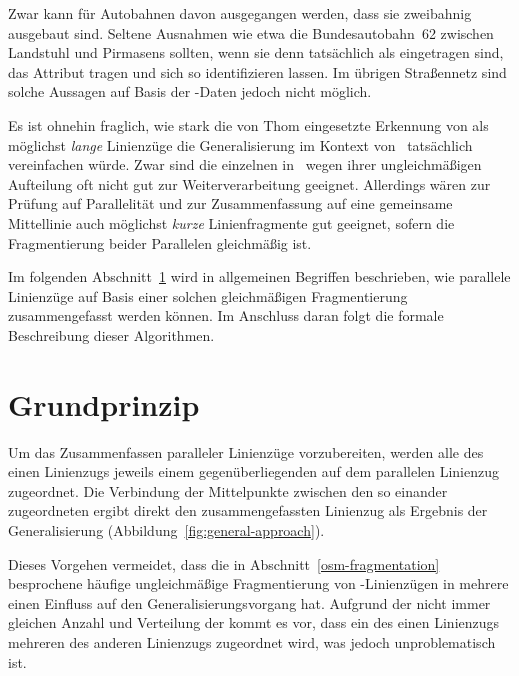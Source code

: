 \documentclass[../main/thesis.tex]{subfiles}
\begin{document}
Zwar kann für Autobahnen davon ausgegangen werden, dass sie zweibahnig ausgebaut sind.
Seltene Ausnahmen wie etwa die Bundesautobahn~62 zwischen Landstuhl und Pirmasens sollten, wenn sie denn tatsächlich als  eingetragen sind, das Attribut  tragen und sich so identifizieren lassen.
Im übrigen Straßennetz sind solche Aussagen auf Basis der \osm-Daten jedoch nicht möglich.

Es ist ohnehin fraglich, wie stark die von Thom eingesetzte Erkennung von  als möglichst \emph{lange} Linienzüge die Generalisierung im Kontext von \osm\ tatsächlich vereinfachen würde.
Zwar sind die einzelnen  in \osm\ wegen ihrer ungleichmäßigen Aufteilung oft nicht gut zur Weiterverarbeitung geeignet.
Allerdings wären zur Prüfung auf Parallelität und zur Zusammenfassung auf eine gemeinsame Mittellinie auch möglichst \emph{kurze} Linienfragmente gut geeignet, sofern die Fragmentierung beider Parallelen gleichmäßig ist.

Im folgenden Abschnitt~\ref{ch:algorithm-principle} wird in allgemeinen Begriffen beschrieben, wie parallele Linienzüge auf Basis einer solchen gleichmäßigen Fragmentierung zusammengefasst werden können.
Im Anschluss daran folgt die formale Beschreibung dieser Algorithmen.


\section{Grundprinzip}
\label{ch:algorithm-principle}

Um das Zusammenfassen paralleler Linienzüge vorzubereiten, werden alle  des einen Linienzugs jeweils einem gegenüberliegenden  auf dem parallelen Linienzug zugeordnet.
Die Verbindung der Mittelpunkte zwischen den so einander zugeordneten  ergibt direkt den zusammengefassten Linienzug als Ergebnis der Generalisierung (Abbildung~\ref{fig:general-approach}).

Dieses Vorgehen vermeidet, dass die in Abschnitt~\ref{osm-fragmentation} besprochene häufige ungleichmäßige Fragmentierung von \osm-Linienzügen in mehrere  einen Einfluss auf den Generalisierungsvorgang hat.
Aufgrund der nicht immer gleichen Anzahl und Verteilung der  kommt es vor, dass ein  des einen Linienzugs mehreren  des anderen Linienzugs zugeordnet wird, was jedoch unproblematisch ist.
\end{document}

